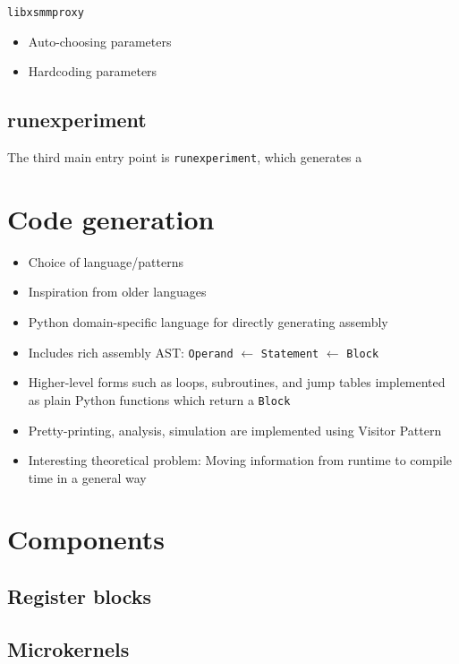 \texttt{libxsmmproxy} 

\begin{itemize}
	\item Auto-choosing parameters
	\item Hardcoding parameters
\end{itemize}

\subsection{runexperiment}
The third main entry point is \texttt{runexperiment}, which generates a 



\section{Code generation}
\begin{itemize}
	\item Choice of language/patterns
	\item Inspiration from older languages
\end{itemize}

\begin{itemize}
    \item Python domain-specific language for directly generating assembly
    \item Includes rich assembly AST: \texttt{Operand} $\leftarrow$ \texttt{Statement} $\leftarrow$ \texttt{Block} 
    \item Higher-level forms such as loops, subroutines, and jump tables
          implemented as plain Python functions which return a \texttt{Block}
    \item Pretty-printing, analysis, simulation are implemented using Visitor Pattern
    \item Interesting theoretical problem: Moving information from runtime to compile time in a general way
\end{itemize}

\section{Components}
\subsection{Register blocks}
\subsection{Microkernels}

